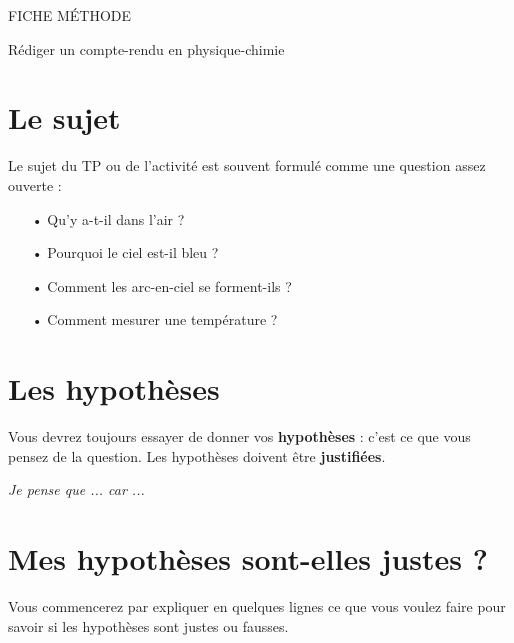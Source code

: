 
\cfoot{} %



\begin{header}
FICHE MÉTHODE

Rédiger un compte-rendu en physique-chimie
\end{header}

\section*{Le sujet}

Le sujet du TP ou de l'activité est souvent formulé comme une question assez ouverte :
\begin{itemize}
\item[•] Qu'y a-t-il dans l'air ?
\item[•] Pourquoi le ciel est-il bleu ?
\item[•] Comment les arc-en-ciel se forment-ils ?
\item[•] Comment mesurer une température ?
\end{itemize}

\section*{Les hypothèses}

Vous devrez toujours essayer de donner vos \textbf{hypothèses} : c'est ce que vous pensez de la question.
Les hypothèses doivent être \textbf{justifiées}.
\begin{center}
\emph{Je pense que ... car ...}
\end{center}

\section*{Mes hypothèses sont-elles justes ?}

Vous commencerez par expliquer en quelques lignes ce que vous voulez faire pour savoir si les hypothèses sont justes ou fausses.

